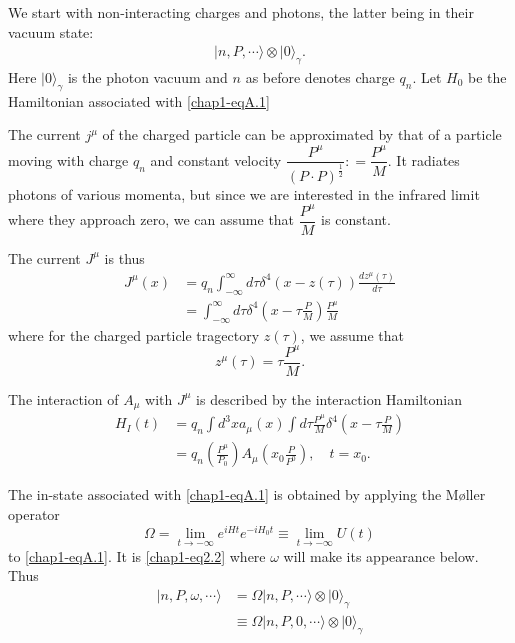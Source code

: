 We start with non-interacting charges and photons, the latter being in their vacuum state:
\begin{align*}
  |n, P, \cdots \rangle \otimes | 0 \rangle_\gamma. \label{chap1-eqA.1}\tag{A.1}
\end{align*}
Here $|0 \rangle_\gamma$ is the photon vacuum and $n$ as before denotes charge $q_n$. Let $H_0$ be the Hamiltonian associated with \eqref{chap1-eqA.1}

The current $j^\mu$ of the charged particle can be approximated by that of a particle moving with charge $q_n$ and constant velocity $\dfrac{P^\mu}{(P\cdot P)^{\frac{1}{2}}}: = \dfrac{P^\mu}{M}$. It radiates photons of various momenta, but since we are interested in the infrared limit where they approach zero, we can assume that $\dfrac{P^\mu}{M}$ is constant.

The current $J^\mu$ is thus
\begin{align*}
  J^\mu (x) & = q_n \int^\infty_{-\infty} d \tau \delta^4 (x- z (\tau)) \frac{dz^\mu(\tau)}{d\tau}\\
  & = \int^\infty_{-\infty} d \tau \delta^4 \left(x- \tau \frac{P}{M}\right) \frac{P^\mu}{M}\label{chap1-eqA.2}\tag{A.2}
\end{align*}
where for the charged particle tragectory $z(\tau)$, we assume that
\begin{equation*}
z^\mu (\tau) = \tau \frac{P^\mu}{M}. \label{chap1-eqA.3}\tag{A.3}
\end{equation*}

The interaction of $A_\mu$ with $J^\mu$ is described by the interaction Hamiltonian
\begin{align*}
  H_I(t) & = q_n \int d^3 x a_\mu (x) \int d \tau \frac{P^\mu}{M} \delta^4 \left( x- \tau \frac{P}{M} \right) \label{chap1-eqA.4}\tag{A.4}\\
  & = q_n \left( \frac{P^\mu}{P_0}\right) A_\mu \left( x_0 \frac{P}{P^0}\right), \quad t= x_0. \label{chap1-eqA.5}\tag{A.5}
\end{align*}

The in-state associated with \eqref{chap1-eqA.1} is obtained by applying the M\o{}ller operator
\begin{equation*}
\Omega = \lim\limits_{t \to -\infty} e^{iHt}e^{-iH_0t}\equiv \lim\limits_{t \to -\infty} U(t)\label{chap1-eqA.6}\tag{A.6}
\end{equation*}
to \eqref{chap1-eqA.1}. It is \eqref{chap1-eq2.2} where $\omega$ will make its appearance below. Thus
\begin{align*}
  | n, P, \omega, \cdots \rangle & = \Omega | n, P, \cdots \rangle \otimes | 0 \rangle_\gamma\\
  & \equiv \Omega|n, P, 0, \cdots \rangle \otimes |0 \rangle_\gamma \label{chap1-eqA.7}\tag{A.7}
\end{align*}

